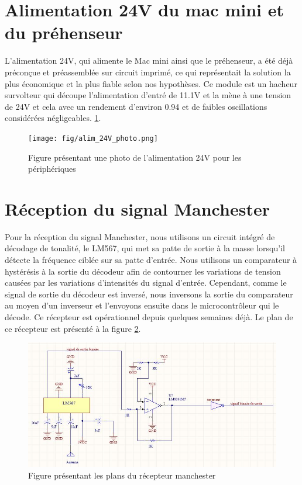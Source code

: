 \section{Alimentation 24V du mac mini et du préhenseur}
L’alimentation 24V, qui alimente le Mac mini ainsi que le préhenseur, a été déjà préconçue et préassemblée sur circuit imprimé, ce qui représentait la solution la plus économique et la plus fiable selon nos hypothèses. Ce module est un hacheur survolteur qui découpe l’alimentation d’entré de 11.1V et la mène à une tension de 24V et cela avec un rendement d’environ 0.94 et de faibles oscillations considérées négligeables. \ref{fig:alim24Vphoto}.

\begin{figure}[htbp]
\centering
\texttt{[image: fig/alim\_24V\_photo.png]}
\caption{Figure présentant une photo de l'alimentation 24V pour les périphériques}
\label{fig:alim24Vphoto}
\end{figure}

\section{Réception du signal Manchester}
Pour la réception du signal Manchester, nous utilisons un circuit intégré de décodage de tonalité, le LM567, qui met sa patte de sortie à la masse lorsqu’il détecte la fréquence ciblée sur sa patte d’entrée. Nous utilisons un comparateur à hystérésis à la sortie du décodeur afin de contourner les variations de tension causées par les variations d’intensités du signal d’entrée. Cependant, comme le signal de sortie du décodeur est inversé, nous inversons la sortie du comparateur au moyen d'un inverseur et l'envoyons ensuite dans le microcontrôleur qui le décode. Ce récepteur est opérationnel depuis quelques semaines déjà. Le plan de ce récepteur est présenté à la figure \ref{fig:manchester}.

\begin{figure}[htbp]
\centering
\includegraphics[scale=0.5]{fig/circuit_manchester.jpg}
\caption{Figure présentant les plans du récepteur manchester}
\label{fig:manchester}
\end{figure}

